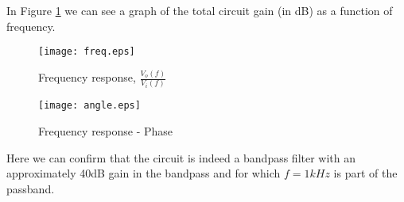 In Figure \ref{fig:freq_response} we can see a graph of the total circuit gain (in dB) as a function of frequency.


\begin{figure}[H] \centering
\texttt{[image: freq.eps]}
\caption{Frequency response, $\frac{V_o(f)}{V_i(f)}$}
\label{fig:freq_response}
\end{figure}

\begin{figure}[H] \centering
\texttt{[image: angle.eps]}
\caption{Frequency response - Phase}
\label{fig:freq_response_phase}
\end{figure}

Here we can confirm that the circuit is indeed a bandpass filter with an approximately 40dB gain in the bandpass and for which $f = 1 kHz$ is part of the passband. 




